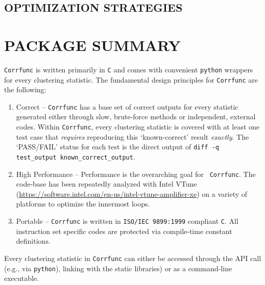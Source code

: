 \documentclass[preprint, 12pt, authoryear]{elsarticle}
\begin{document}
\subsection{OPTIMIZATION STRATEGIES}

\section{PACKAGE SUMMARY}
{\tt Corrfunc} is written primarily in {\tt C} and comes with convenient
{\tt python} wrappers for every clustering statistic. The fundamental design
principles for {\tt Corrfunc} are the following:
\begin{enumerate}
  \item Correct -- {\tt Corrfunc} has a base set of correct outputs for every statistic
    generated either through slow, brute-force methods or independent, 
    external codes. Within {\tt Corrfunc}, every clustering statistic is covered with at least one
    test case that {\em requires} reproducing this `known-correct' result {\em
      exactly}. The `PASS/FAIL' status for each test is the direct output of {\tt diff -q
      test\_output known\_correct\_output}.  
  \item High Performance -- Performance is the overarching goal for {\tt
    Corrfunc}. The code-base has been repeatedly analyzed with Intel VTune
    (\url{https://software.intel.com/en-us/intel-vtune-amplifier-xe})
    on a variety of platforms to optimize the innermost loops. 
  \item Portable -- {\tt Corrfunc} is written in {\tt ISO/IEC 9899:1999}
    compliant {\tt C}. All instruction set specific codes are protected via compile-time constant
    definitions.
\end{enumerate}
Every clustering statistic in {\tt Corrfunc} can either be accessed through the
API call (e.g., via {\tt python}), linking with the static libraries) or as
a command-line executable. 
\end{document}
